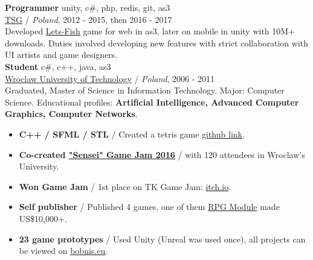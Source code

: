 \documentclass[12pt,a4paper]{article}
\begin{document}
\begin{multicols}{2}
	{\large \textbf{Programmer}} \hfill \textcolor{techColor}{unity, c\#, php, redis, git, as3} \\
	{\href{https://tensquaregames.com/}{TSG}}   / \textit{Poland}, 2012 - 2015, then 2016 - 2017 \\
	Developed {\href{https://play.google.com/store/apps/details?id=air.com.tensquaregames.letsfish}{Lets-Fish}} game for web in as3, later on mobile in unity with 10M+ downloads. Duties involved developing new features with strict collaboration with UI artists and game designers. \\

	{\large \textbf{Student}} \hfill \textcolor{techColor}{c\#, c++, java, as3} \\
	{\href{https://pwr.edu.pl/en/}{Wroclaw University of Technology}}  / \textit{Poland}, 2006 - 2011  \\
	Graduated, Master of Science in Information Technology. Major: Computer Science. Educational profiles: \textbf{Artificial Intelligence, Advanced Computer Graphics, Computer Networks}.



\begin{itemize}[leftmargin=7.0cm]
	\centering
	\section*{After hours}
	\justifying
	\setlength\itemsep{0.0cm}
	\item[]  \textbf{C++ / SFML / STL} / Created a tetris game {\href{https://github.com/kbobnis/tetris}{github link}}. \\
	\item[] \textbf{Co-created {\href{https://www.facebook.com/events/1110429105711126}{"Sensei" Game Jam 2016}}} / with 120 attendees in Wroclaw's University. \\
	\item[]  \textbf{Won Game Jam} / 1st place on TK Game Jam: {\href{https://itch.io/jam/tk-game-jam-2016/results}{itch.io}}. \\
	\item[] \textbf{Self publisher} / Published 4 games, one of them {\href{https://play.google.com/store/apps/details?id=com.wyspianStudios.rpgModuleFull}{RPG Module}} made US\$10,000+. \\
	\item[] \textbf{23 game prototypes} / Used Unity (Unreal was used once), all projects can be viewed on  {\href{http://bobnis.eu}{bobnis.eu}}. \\
\end{itemize}


\end{multicols}
\end{document}

